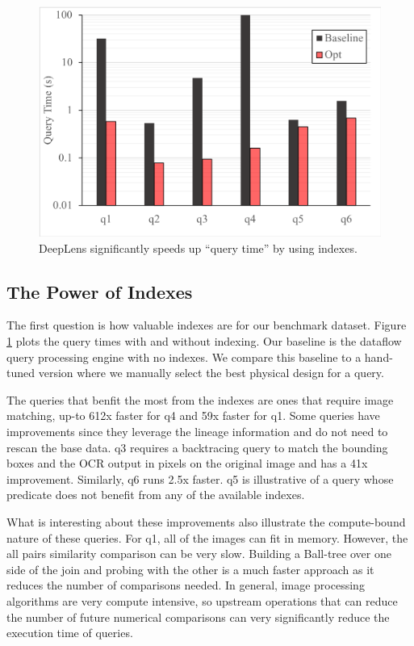 \begin{figure}[t]
\centering
 \includegraphics[width=\columnwidth]{figures/query.png}
 \caption{\textsf{DeepLens} significantly speeds up ``query time'' by using indexes.  \label{query} }
\end{figure}

\subsection{The Power of Indexes}
The first question is how valuable indexes are for our benchmark dataset.
Figure \ref{query} plots the query times with and without indexing.
Our baseline is the dataflow query processing engine with no indexes.
We compare this baseline to a hand-tuned version where we manually select the best physical design for a query.

The queries that benfit the most from the indexes are ones that require image matching, up-to 612x faster for q4 and 59x faster for q1. Some queries have improvements since they leverage the lineage information and do not need to rescan the base data. q3 requires a backtracing query to match the bounding boxes and the OCR output in pixels on the original image and has a 41x improvement. Similarly, q6 runs 2.5x faster. q5 is illustrative of a query whose predicate does not benefit from any of the available indexes.

What is interesting about these improvements also illustrate the compute-bound nature of these queries.
For q1, all of the images can fit in memory.
However, the all pairs similarity comparison can be very slow.
Building a Ball-tree over one side of the join and probing with the other is a much faster approach as it reduces the number of comparisons needed.
In general, image processing algorithms are very compute intensive, so upstream operations that can reduce the number of future numerical comparisons can very significantly reduce the execution time of queries.


